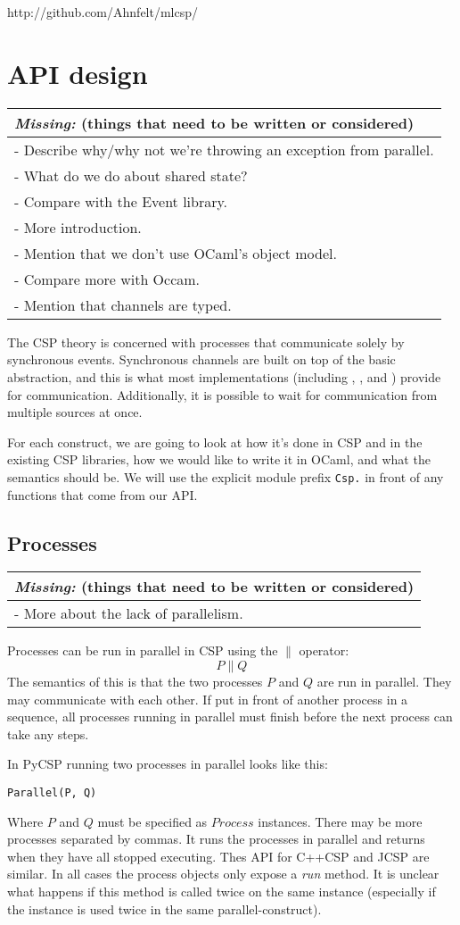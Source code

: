 \documentclass[a4paper,12pt]{article}
\newcommand{\missing}[1]{
  \begin{tabular}{|p{11cm}|}
    \hline
    \emph{Missing:} {\scriptsize (things that need to be written or considered)} \\
    \hline
    #1
    \hline
  \end{tabular}
}
\begin{document}
\begin{center}
http://github.com/Ahnfelt/mlcsp/
\end{center}


\section{API design}
\label{analysis}
\missing{
- Describe why/why not we're throwing an exception from parallel.\\
- What do we do about shared state?\\
- Compare with the Event library.\\
- More introduction.\\
- Mention that we don't use OCaml's object model.\\
- Compare more with Occam.\\
- Mention that channels are typed.\\
}

The CSP theory is concerned with processes that communicate solely by synchronous 
events. Synchronous channels are built on top of the basic abstraction, and this is
what most implementations (including \cite{occam}, \cite{c++csp}, \cite{jcsp} and 
\cite{pycsp}) provide for communication. 
Additionally, it is possible to wait for communication from multiple sources at once.

For each construct, we are going to look at how it's done in CSP and in the 
existing CSP libraries, how we would like to write it in OCaml, and what the 
semantics should be. We will use the explicit module prefix \verb|Csp.| in front
of any functions that come from our API.

\subsection{Processes}
\missing{
- More about the lack of parallelism.\\
}

Processes can be run in parallel in CSP using the $\parallel$ operator:
\[P \parallel Q\]
The semantics of this is that the two processes $P$ and $Q$ are run in parallel. They
may communicate with each other. If put in front of another process in a sequence, all
processes running in parallel must finish before the next process can take any steps.

In PyCSP running two processes in parallel looks like this:
\begin{verbatim}
Parallel(P, Q)
\end{verbatim}
Where $P$ and $Q$ must be specified as $Process$ instances. There may be more processes
separated by commas. It runs the processes in parallel and returns when they have all 
stopped executing. Thes API for C++CSP and JCSP are similar. In all cases the
process objects only expose a \emph{run} method. It is unclear what happens if
this method is called twice on the same instance (especially if the instance is
used twice in the same parallel-construct).
\end{document}
